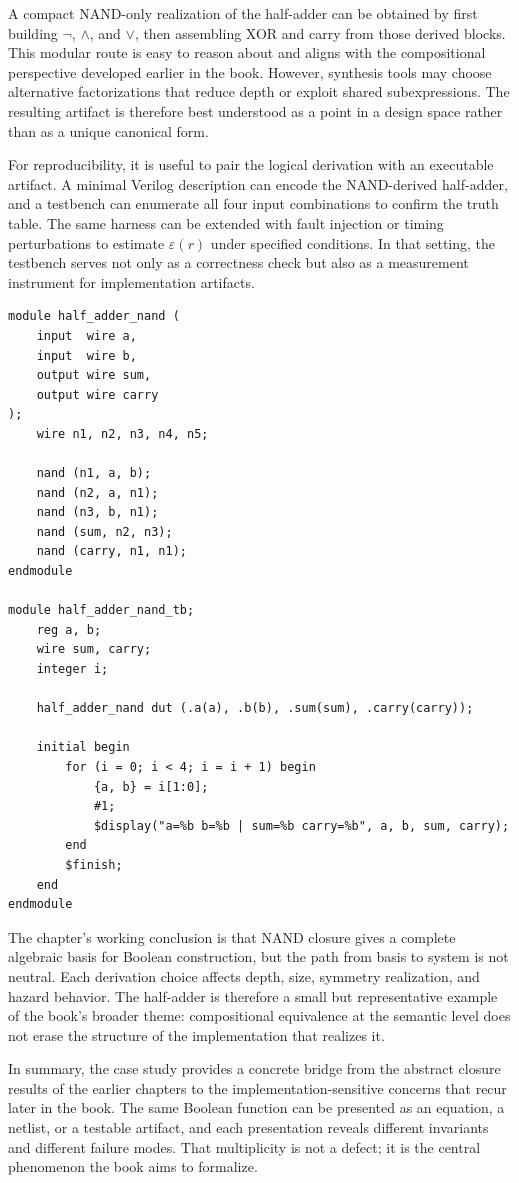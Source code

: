 \documentclass[11pt]{article}
\begin{document}
A compact NAND-only realization of the half-adder can be obtained by first building \(\neg\), \(\wedge\), and \(\vee\), then assembling XOR and carry from those derived blocks. This modular route is easy to reason about and aligns with the compositional perspective developed earlier in the book. However, synthesis tools may choose alternative factorizations that reduce depth or exploit shared subexpressions. The resulting artifact is therefore best understood as a point in a design space rather than as a unique canonical form.

For reproducibility, it is useful to pair the logical derivation with an executable artifact. A minimal Verilog description can encode the NAND-derived half-adder, and a testbench can enumerate all four input combinations to confirm the truth table. The same harness can be extended with fault injection or timing perturbations to estimate \(\varepsilon(r)\) under specified conditions. In that setting, the testbench serves not only as a correctness check but also as a measurement instrument for implementation artifacts.

\begin{verbatim}
module half_adder_nand (
    input  wire a,
    input  wire b,
    output wire sum,
    output wire carry
);
    wire n1, n2, n3, n4, n5;

    nand (n1, a, b);
    nand (n2, a, n1);
    nand (n3, b, n1);
    nand (sum, n2, n3);
    nand (carry, n1, n1);
endmodule

module half_adder_nand_tb;
    reg a, b;
    wire sum, carry;
    integer i;

    half_adder_nand dut (.a(a), .b(b), .sum(sum), .carry(carry));

    initial begin
        for (i = 0; i < 4; i = i + 1) begin
            {a, b} = i[1:0];
            #1;
            $display("a=%b b=%b | sum=%b carry=%b", a, b, sum, carry);
        end
        $finish;
    end
endmodule
\end{verbatim}

The chapter’s working conclusion is that NAND closure gives a complete algebraic basis for Boolean construction, but the path from basis to system is not neutral. Each derivation choice affects depth, size, symmetry realization, and hazard behavior. The half-adder is therefore a small but representative example of the book’s broader theme: compositional equivalence at the semantic level does not erase the structure of the implementation that realizes it.

In summary, the case study provides a concrete bridge from the abstract closure results of the earlier chapters to the implementation-sensitive concerns that recur later in the book. The same Boolean function can be presented as an equation, a netlist, or a testable artifact, and each presentation reveals different invariants and different failure modes. That multiplicity is not a defect; it is the central phenomenon the book aims to formalize.
\end{document}
